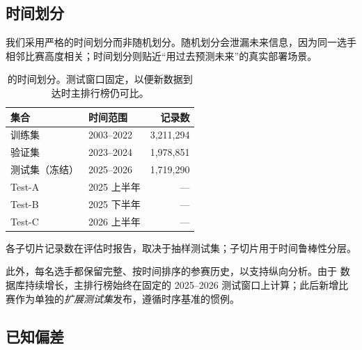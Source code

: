 \subsection{时间划分}
\label{sec:data-splits}

我们采用严格的时间划分而非随机划分。随机划分会泄漏未来信息，因为同一选手相邻比赛高度相关；时间划分则贴近“用过去预测未来”的真实部署场景。

\begin{table}[t]
  \centering
  \small
  \begin{threeparttable}
  \caption{\wcabench{} 的时间划分。测试窗口固定，以便新数据到达时主排行榜仍可比。}
  \label{tab:splits}
  \begin{tabular}{llr}
    \toprule
    集合 & 时间范围 & 记录数 \\
    \midrule
    训练集 & 2003--2022 & 3{,}211{,}294 \\
    验证集 & 2023--2024 & 1{,}978{,}851 \\
    测试集（冻结） & 2025--2026 & 1{,}719{,}290 \\
    \quad Test-A & 2025 上半年 & --- \\
    \quad Test-B & 2025 下半年 & --- \\
    \quad Test-C & 2026 上半年 & --- \\
    \bottomrule
  \end{tabular}
  \begin{tablenotes}\footnotesize
    \item 各子切片记录数在评估时报告，取决于抽样测试集；子切片用于时间鲁棒性分层。
  \end{tablenotes}
  \end{threeparttable}
\end{table}

此外，每名选手都保留完整、按时间排序的参赛历史，以支持纵向分析。由于 \wca{} 数据库持续增长，主排行榜始终在固定的 2025--2026 测试窗口上计算；此后新增比赛作为单独的\emph{扩展测试集}发布，遵循时序基准的惯例。

\subsection{已知偏差}
\label{sec:data-biases}

